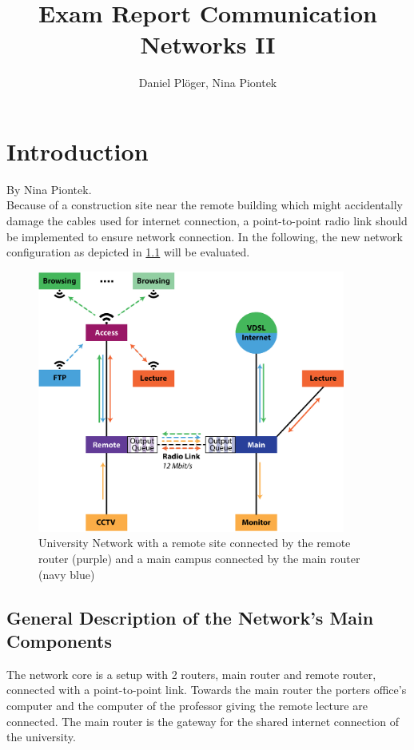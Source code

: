 \documentclass[a4paper,10pt]{book}\usepackage{graphicx}
\title{Exam Report Communication Networks II}
\author{Daniel Plöger, Nina Piontek}
\begin{document}
\maketitle
\tableofcontents



\chapter{Introduction}
By Nina Piontek.\\

Because of a construction site near the remote building which might accidentally damage the cables 
used for internet connection,
a point-to-point radio link should be implemented to ensure network connection.
In the following, the new network configuration as depicted in \ref{fig:network} will be evaluated.
\begin{figure}[!ht]
  \begin{center}
    \includegraphics[width=0.9\textwidth]{graphics-03.eps}
    \caption{University Network with a remote site connected by the remote router (purple) and a main campus connected by the main router (navy blue)}
    \label{fig:network}
  \end{center}
\end{figure}

\section{General Description of the Network's Main Components}

The network core is a setup with 2 routers, main router and remote router, connected with a point-to-point link. 
Towards the main router the porters office's computer and the computer of the professor giving the remote lecture are connected.
The main router is the gateway for the shared internet connection of the university.
\end{document}

